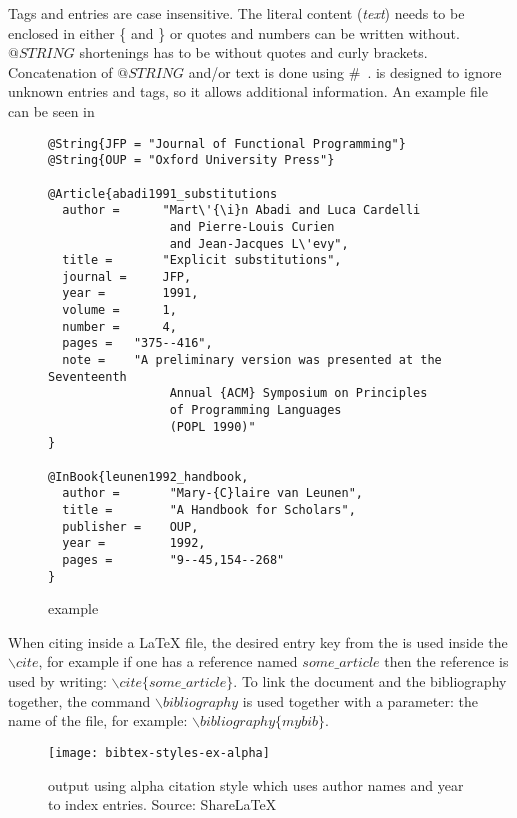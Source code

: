 Tags and entries are case insensitive. The literal content
(\emph{text}) needs to be enclosed in either \{ and \} or quotes and
numbers can be written without.  $@STRING$ shortenings has to be
without quotes and curly brackets.  Concatenation of $@STRING$ and/or
text is done using \#~\cite{bibtex_resource}.  {\bibtex} is designed
to ignore unknown entries and tags, so it allows additional
information.  An example {\bibtex} file can be seen in

\begin{figure}
  \centering
  \begin{small}
\begin{verbatim}
@String{JFP = "Journal of Functional Programming"}
@String{OUP = "Oxford University Press"}

@Article{abadi1991_substitutions
  author =      "Mart\'{\i}n Abadi and Luca Cardelli
                 and Pierre-Louis Curien
                 and Jean-Jacques L\'evy",
  title =       "Explicit substitutions",
  journal =     JFP,
  year =        1991,
  volume =      1,
  number =      4,
  pages =	"375--416",
  note =	"A preliminary version was presented at the Seventeenth
                 Annual {ACM} Symposium on Principles
                 of Programming Languages
                 (POPL 1990)"
}

@InBook{leunen1992_handbook,
  author =       "Mary-{C}laire van Leunen",
  title =        "A Handbook for Scholars",
  publisher =    OUP,
  year =         1992,
  pages =        "9--45,154--268"
}
\end{verbatim}
  \end{small}
  \caption{{\bibtex} example}
\label{fig:bibtex_example}
\end{figure}

When citing inside a {\LaTeX} file, the desired entry key from the
{\bibtex} is used inside the ${\backslash}cite$, for example if one
has a reference named $some\_article$ then the reference is used by
writing: ${\backslash}cite\{some\_article\}$.  To link the document
and the bibliography together, the command ${\backslash}bibliography$
is used together with a parameter: the name of the {\bibtex} file, for
example: ${\backslash}bibliography\{mybib\}$.

\begin{figure}
  \centering
  \texttt{[image: bibtex-styles-ex-alpha]}
  \caption{{\bibtex} output using alpha citation style which uses
    author names and year to index entries.  Source:
    ShareLaTeX~\cite{sharelatex2016_styles}}
\label{fig:bibtex_example_alpha}
\end{figure}


